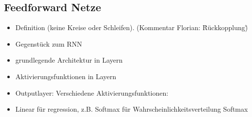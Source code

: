 \subsection{Feedforward Netze}

\color{blue}
\begin{itemize}
	\item Definition (keine Kreise oder Schleifen). (Kommentar Florian: \"Rückkopplung\")
	\item Gegenstück zum RNN
	\item grundlegende Architektur in Layern 
	\item Aktivierungsfunktionen in Layern
	\item Outputlayer: Verschiedene Aktivierungsfunktionen:
	\item Linear für regression, z.B. Softmax für Wahrscheinlichkeitsverteilung Softmax
\end{itemize}
\color{black}


